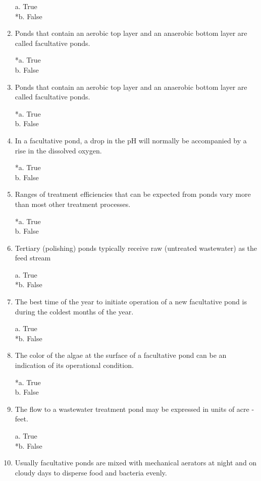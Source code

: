 \begin{enumerate}
a. True \\
*b. False 


\item  Ponds that contain an aerobic top layer and an anaerobic bottom layer are called facultative ponds. 

*a. True \\
b. False 


\item  Ponds that contain an aerobic top layer and an anaerobic bottom layer are called facultative ponds. 

*a. True \\
b. False 


\item  In a facultative pond, a drop in the pH will normally be accompanied by a rise in the dissolved oxygen. 

*a. True \\
b. False 


\item  Ranges of treatment efficiencies that can be expected from ponds vary more than most other treatment processes. 

*a. True \\
b. False 


\item  Tertiary (polishing) ponds typically receive raw (untreated wastewater) as the feed stream 

a. True \\
*b. False 


\item  The best time of the year to initiate operation of a new facultative pond is during the coldest months of the year. 

a. True \\
*b. False 


\item  The color of the algae at the surface of a facultative pond can be an indication of its operational condition. 

*a. True \\
b. False 


\item  The flow to a wastewater treatment pond may be expressed in units of acre -feet. 

a. True \\
*b. False 


\item  Usually facultative ponds are mixed with mechanical aerators at night and on cloudy days to disperse food and bacteria evenly. 


\end{enumerate}
